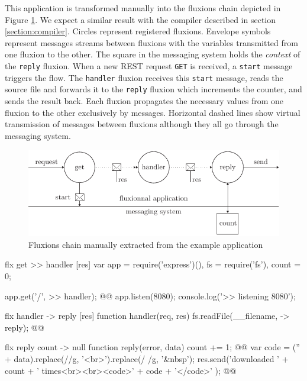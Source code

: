 This application is transformed manually into the fluxions chain depicted in Figure \ref{fig:fluxions}.
We expect a similar result with the compiler described in section \ref{section:compiler}.
Circles represent registered fluxions.
Envelope symbols represent messages streams between fluxions with the variables transmitted from one fluxion to the other.
The square in the messaging system holds the \textit{context} of the \texttt{reply} fluxion.
When a new REST request \texttt{GET} is received, a \texttt{start} message triggers the flow.
The \texttt{handler} fluxion receives this \texttt{start} message, reads the source file and forwards it to the \texttt{reply} fluxion which increments the counter, and sends the result back.
Each fluxion propagates the necessary values from one fluxion to the other exclusively by messages.
Horizontal dashed lines show virtual transmission of messages between fluxions although they all go through the messaging system.

\begin{figure}[h!]
  \includegraphics[width=\linewidth]{ressources/flux.pdf}
  \caption{Fluxions chain manually extracted from the example application}
  \label{fig:fluxions}
\end{figure}

\begin{code}[flx, caption={Manual transformation of the example application in our high-level fluxional language},label={lst:fluxional}]
flx get
>> handler [res]
  var app = require('express')(),
      fs = require('fs'),
      count = 0;

  app.get('/', >> handler); @\label{lst:fluxional-streamtohandler}@
  app.listen(8080);
  console.log('>> listening 8080');

flx handler
-> reply [res]
  function handler(req, res) {
    fs.readFile(__filename, -> reply); @\label{lst:fluxional-readfile}@
  }

flx reply {count}
-> null
  function reply(error, data) {
    count += 1; @\label{lst:fluxional-counter}@
    var code = ('' + data).replace(/\n/g, '<br>').replace(/ /g, '&nbsp');
    res.send('downloaded ' + count + ' times<br><br><code>' + code + '</code>' ); @\label{lst:fluxional-ressend}@
  }
\end{code}

